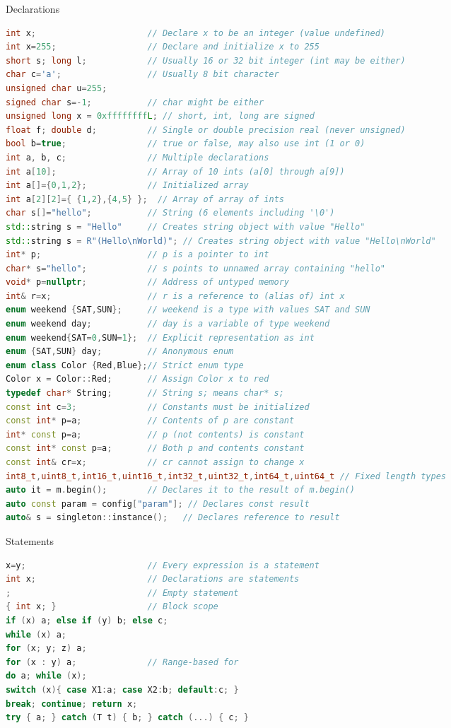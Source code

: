 \documentclass[final]{beamer}
\begin{document}
\begin{frame}[t,fragile]
\begin{columns}[t,totalwidth=\paperwidth, colsep=0.015\paperwidth]
\begin{column}{0.32\paperwidth}
\begin{block}{Declarations}
\begin{lstlisting}[language=C++]
int x;                      // Declare x to be an integer (value undefined)
int x=255;                  // Declare and initialize x to 255
short s; long l;            // Usually 16 or 32 bit integer (int may be either)
char c='a';                 // Usually 8 bit character
unsigned char u=255;
signed char s=-1;           // char might be either
unsigned long x = 0xffffffffL; // short, int, long are signed
float f; double d;          // Single or double precision real (never unsigned)
bool b=true;                // true or false, may also use int (1 or 0)
int a, b, c;                // Multiple declarations
int a[10];                  // Array of 10 ints (a[0] through a[9])
int a[]={0,1,2};            // Initialized array
int a[2][2]={ {1,2},{4,5} };  // Array of array of ints
char s[]="hello";           // String (6 elements including '\0')
std::string s = "Hello"     // Creates string object with value "Hello"
std::string s = R"(Hello\nWorld)"; // Creates string object with value "Hello\nWorld"
int* p;                     // p is a pointer to int
char* s="hello";            // s points to unnamed array containing "hello"
void* p=nullptr;            // Address of untyped memory
int& r=x;                   // r is a reference to (alias of) int x
enum weekend {SAT,SUN};     // weekend is a type with values SAT and SUN
enum weekend day;           // day is a variable of type weekend
enum weekend{SAT=0,SUN=1};  // Explicit representation as int
enum {SAT,SUN} day;         // Anonymous enum
enum class Color {Red,Blue};// Strict enum type
Color x = Color::Red;       // Assign Color x to red
typedef char* String;       // String s; means char* s;
const int c=3;              // Constants must be initialized
const int* p=a;             // Contents of p are constant
int* const p=a;             // p (not contents) is constant
const int* const p=a;       // Both p and contents constant
const int& cr=x;            // cr cannot assign to change x
int8_t,uint8_t,int16_t,uint16_t,int32_t,uint32_t,int64_t,uint64_t // Fixed length types
auto it = m.begin();        // Declares it to the result of m.begin()
auto const param = config["param"]; // Declares const result
auto& s = singleton::instance();   // Declares reference to result
\end{lstlisting}
\end{block}


\begin{block}{Statements}
\begin{lstlisting}[language=C++]
x=y;                        // Every expression is a statement
int x;                      // Declarations are statements
;                           // Empty statement
{ int x; }                  // Block scope
if (x) a; else if (y) b; else c;
while (x) a;
for (x; y; z) a;
for (x : y) a;              // Range-based for
do a; while (x);
switch (x){ case X1:a; case X2:b; default:c; }
break; continue; return x;
try { a; } catch (T t) { b; } catch (...) { c; }


\end{lstlisting}
\end{block}
\end{column}
\end{columns}
\end{frame}
\end{document}
